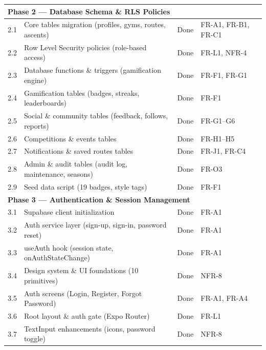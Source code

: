 \documentclass[12pt,a4paper]{report}
\renewcommand\_{\textunderscore\hspace{0pt}}
\begin{document}
\begin{longtable}{l >{\raggedright\arraybackslash}p{7.5cm} c >{\raggedright\arraybackslash}p{3cm}}
\hline
\multicolumn{4}{l}{\textbf{Phase 2 --- Database Schema \& RLS Policies}} \\
\hline
2.1 & Core tables migration (profiles, gyms, routes, ascents) & Done & FR-A1, FR-B1, FR-C1 \\
2.2 & Row Level Security policies (role-based access) & Done & FR-L1, NFR-4 \\
2.3 & Database functions \& triggers (gamification engine) & Done & FR-F1, FR-G1 \\
2.4 & Gamification tables (badges, streaks, leaderboards) & Done & FR-F1 \\
2.5 & Social \& community tables (feedback, follows, reports) & Done & FR-G1--G6 \\
2.6 & Competitions \& events tables & Done & FR-H1--H5 \\
2.7 & Notifications \& saved routes tables & Done & FR-J1, FR-C4 \\
2.8 & Admin \& audit tables (audit log, maintenance, seasons) & Done & FR-O3 \\
2.9 & Seed data script (19 badges, style tags) & Done & FR-F1 \\

\hline
\multicolumn{4}{l}{\textbf{Phase 3 --- Authentication \& Session Management}} \\
\hline
3.1 & Supabase client initialization & Done & FR-A1 \\
3.2 & Auth service layer (sign-up, sign-in, password reset) & Done & FR-A1 \\
3.3 & useAuth hook (session state, onAuthStateChange) & Done & FR-A1 \\
3.4 & Design system \& UI foundations (10 primitives) & Done & NFR-8 \\
3.5 & Auth screens (Login, Register, Forgot Password) & Done & FR-A1, FR-A4 \\
3.6 & Root layout \& auth gate (Expo Router) & Done & FR-L1 \\
3.7 & TextInput enhancements (icons, password toggle) & Done & NFR-8 \\


\end{longtable}
\end{document}
